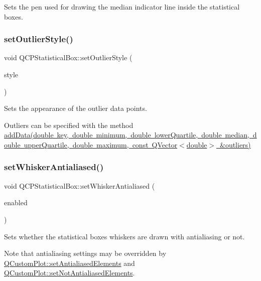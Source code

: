 Sets the pen used for drawing the median indicator line inside the statistical boxes. \mbox{\label{class_q_c_p_statistical_box_ad5241943422eb8e58360a97e99ad6aa7}} 
\subsubsection{\texorpdfstring{setOutlierStyle()}{setOutlierStyle()}}
{\footnotesize\ttfamily void Q\+C\+P\+Statistical\+Box\+::set\+Outlier\+Style (\begin{DoxyParamCaption}\item[{const \mbox{\hyperlink{class_q_c_p_scatter_style}{Q\+C\+P\+Scatter\+Style}} \&}]{style }\end{DoxyParamCaption})}

Sets the appearance of the outlier data points.

Outliers can be specified with the method \mbox{\hyperlink{class_q_c_p_statistical_box_a026f2790b530d6f29312254ecb1e7c1e}{add\+Data(double key, double minimum, double lower\+Quartile, double median, double upper\+Quartile, double maximum, const Q\+Vector$<$double$>$ \&outliers)}} \mbox{\label{class_q_c_p_statistical_box_a61bcd458fba002f72304d11319051843}} 
\subsubsection{\texorpdfstring{setWhiskerAntialiased()}{setWhiskerAntialiased()}}
{\footnotesize\ttfamily void Q\+C\+P\+Statistical\+Box\+::set\+Whisker\+Antialiased (\begin{DoxyParamCaption}\item[{bool}]{enabled }\end{DoxyParamCaption})}

Sets whether the statistical boxes whiskers are drawn with antialiasing or not.

Note that antialiasing settings may be overridden by \mbox{\hyperlink{class_q_custom_plot_af6f91e5eab1be85f67c556e98c3745e8}{Q\+Custom\+Plot\+::set\+Antialiased\+Elements}} and \mbox{\hyperlink{class_q_custom_plot_ae10d685b5eabea2999fb8775ca173c24}{Q\+Custom\+Plot\+::set\+Not\+Antialiased\+Elements}}. \mbox{\label{class_q_c_p_statistical_box_aa8d3e503897788e1abf68dc74b5f147f}} 
